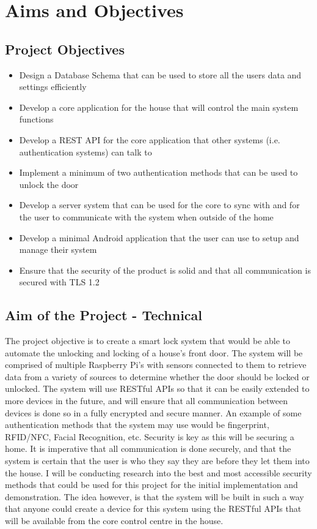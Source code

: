 \section{Aims and Objectives}

\subsection{Project Objectives}
\begin{itemize}
	\item Design a Database Schema that can be used to store all the users data and settings efficiently
	\item Develop a core application for the house that will control the main system functions
	\item Develop a REST API for the core application that other systems (i.e. authentication systems) can talk to
	\item Implement a minimum of two authentication methods that can be used to unlock the door
	\item Develop a server system that can be used for the core to sync with and for the user to communicate with the system when outside of the home
	\item Develop a minimal Android application that the user can use to setup and manage their system
	\item Ensure that the security of the product is solid and that all communication is secured with TLS 1.2
\end{itemize}

\subsection{Aim of the Project - Technical}
The project objective is to create a smart lock system that would be able to automate the unlocking and locking of a house's front door. The system will be comprised of multiple Raspberry Pi's with sensors connected to them to retrieve data from a variety of sources to determine whether the door should be locked or unlocked. The system will use RESTful APIs so that it can be easily extended to more devices in the future, and will ensure that all communication between devices is done so in a fully encrypted and secure manner. An example of some authentication methods that the system may use would be fingerprint, RFID/NFC, Facial Recognition, etc.
\newline
\newline
Security is key as this will be securing a home. It is imperative that all communication is done securely, and that the system is certain that the user is who they say they are before they let them into the house. I will be conducting research into the best and most accessible security methods that could be used for this project for the initial implementation and demonstration. The idea however, is that the system will be built in such a way that anyone could create a device for this system using the RESTful APIs that will be available from the core control centre in the house.


